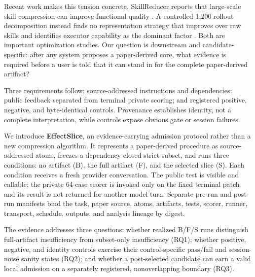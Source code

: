 \documentclass[letterpaper]{article} %
\begin{document}
Recent work makes this tension concrete.  SkillReducer reports that large-scale
skill compression can improve functional quality
\cite{gao2026skillreducer}.  A controlled 1,200-rollout decomposition instead
finds no representation strategy that improves over raw skills and identifies
executor capability as the dominant factor \cite{xu2026compression}.  Both are
important optimization studies.  Our question is downstream and
candidate-specific: after any system proposes a paper-derived core, what evidence
is required before a user is told that it can stand in for the complete
paper-derived artifact?

Three requirements follow: source-addressed instructions and dependencies;
public feedback separated from terminal private scoring; and registered positive,
negative, and byte-identical controls.  Provenance establishes identity, not a
complete interpretation, while controls expose obvious gate or session failures.

We introduce \textbf{EffectSlice}, an evidence-carrying admission protocol rather
than a new compression algorithm.  It represents a paper-derived procedure as
source-addressed atoms, freezes a dependency-closed strict subset, and runs three
conditions: no artifact (B), the full artifact (F), and the selected slice (S).
Each condition receives a fresh provider conversation.  The public test is
visible and callable; the private 64-case scorer is invoked only on the fixed
terminal patch and its result is not returned for another model turn.  Separate
pre-run and post-run manifests bind the task, paper source, atoms, artifacts,
tests, scorer, runner, transport, schedule, outputs, and analysis lineage by
digest.

The evidence addresses three questions: whether realized B/F/S runs distinguish
full-artifact insufficiency from subset-only insufficiency (RQ1); whether positive,
negative, and identity controls exercise their control-specific pass/fail and
session-noise sanity states (RQ2); and whether a post-selected candidate can earn a valid local
admission on a separately registered, nonoverlapping boundary (RQ3).
\end{document}
